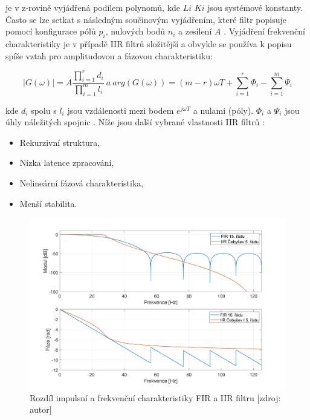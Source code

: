 je v z-rovině vyjádřená podílem polynomů, kde $Li$ $Ki$ jsou systémové
konstanty. Často se lze setkat s následným součinovým vyjádřením, které filtr
popisuje pomocí konfigurace pólů $p_i$, nulových bodů $n_i$ a zesílení $A$
\cite{Jan2002,Prchal2000}. Vyjádření frekvenční charakteristiky je v případě IIR
filtrů složitější a obvykle se používa k popisu spíše vztah pro amplitudovou a
fázovou charakteristiku:

\begin{equation}
	\label{eq:ampphase_iir}
	|G(\omega)| = A \frac{\prod_{i=1}^{r} d_i}{\prod_{i=1}^{m} l_i} ~a~ arg(G(\omega)) = (m-r)\omega T + \sum_{i=1}^{r} \Phi_i - \sum_{i=1}^{m} \Psi_i
\end{equation}

kde $d_i$ spolu s $l_i$ jsou vzdálenosti mezi bodem $e^{j\omega T}$ a nulami
(póly). $\Phi_i$ a $\Psi_i$ jsou úhly náležitých spojnic
\cite{Prchal2000,Jan2002}. Níže jsou další vybrané vlastnosti IIR filtrů
\cite{Jan2002}:

\begin{itemize}
	\item Rekurzivní struktura,
	\item Nízka latence zpracování,
	\item Nelineární fázová charakteristika,
	\item Menší stabilita.
\end{itemize}

\begin{figure}[h]
	\begin{center}
		\includegraphics[width=1\textwidth]{../assets/figures/filters_comparison}
		\caption{Rozdíl impulsní a frekvenční charakteristiky FIR a IIR filtru [zdroj: autor]}
		\label{fig:filters_comparison}
	\end{center}
\end{figure}

